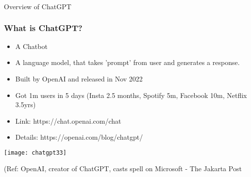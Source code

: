 \begin{frame}[fragile]\frametitle{}
\begin{center}
{\Large Overview of ChatGPT}
\end{center}
\end{frame}

\begin{frame}[fragile]\frametitle{What is ChatGPT?}


\begin{itemize}
\item A Chatbot
\item A language model, that takes 'prompt' from user and generates a response.
\item Built by OpenAI and released in Nov 2022
\item Got 1m users in 5 days  (Insta 2.5 months, Spotify 5m, Facebook 10m, Netflix 3.5yrs)
\end{itemize}	 

\begin{itemize}
\item Link: https://chat.openai.com/chat
\item Details: https://openai.com/blog/chatgpt/
\end{itemize}	 

\begin{center}
\texttt{[image: chatgpt33]}
\end{center}		
		
{\tiny (Ref: OpenAI, creator of ChatGPT, casts spell on Microsoft
- The Jakarta Post}
			
			
\end{frame}




		
